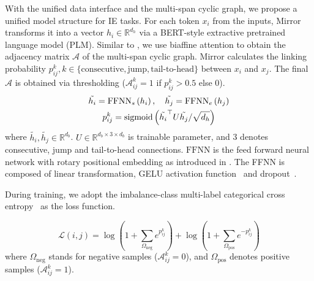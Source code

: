 With the unified data interface and the multi-span cyclic graph, we propose a unified model structure for IE tasks.
For each token $x_i$ from the inputs, Mirror transforms it into a vector $h_i \in \mathbb{R}^{d_h}$ via a BERT-style extractive pretrained language model (PLM).
Similar to \citet{ner-as-dp}, we use biaffine attention to obtain the adjacency matrix $\mathcal{A}$ of the multi-span cyclic graph.
Mirror calculates the linking probability $p_{ij}^{k}, k \in \{\text{consecutive}, \text{jump}, \text{tail-to-head}\}$ between $x_i$ and $x_j$.
The final $\mathcal{A}$ is obtained via thresholding ($\mathcal{A}_{ij}^{k}=1$ if $p_{ij}^{k} > 0.5$ else 0).
\begin{equation}
    \label{eqn:sim_calc}
    \begin{gathered}
    \tilde{h_i} = \text{FFNN}_{s}\left(h_i\right), \quad \tilde{h_j} = \text{FFNN}_{e}\left(h_j\right) \\
    p_{ij}^{k} = \text{sigmoid}\left(\tilde{h_i}^{\top} U \tilde{h_j} / \sqrt{d_h}\right)
    \end{gathered} \\
\end{equation}
where $\tilde{h_i},\tilde{h_j} \in \mathbb{R}^{d_b}$.
$U \in \mathbb{R}^{d_b \times 3 \times d_b}$ is trainable parameter, and 3 denotes consecutive, jump and tail-to-head connections.
$\text{FFNN}$ is the feed forward neural network with rotary positional embedding as introduced in \citet{roformer}.
The FFNN is composed of linear transformation, GELU activation function~\cite{gelu} and dropout~\cite{dropout}.

During training, we adopt the imbalance-class multi-label categorical cross entropy~\cite{global_pointer} as the loss function.

\begin{equation}
    \label{eqn:loss}
    \mathcal{L}(i,j) = \log \left(1 + \sum_{\Omega_{\text{neg}}} e^{p_{ij}^{k}}\right) + \log \left(1 + \sum_{\Omega_{\text{pos}}} e^{-p_{ij}^{k}}\right)
\end{equation}
where $\Omega_{\text{neg}}$ stands for negative samples ($\mathcal{A}_{ij}^{k}=0$), and $\Omega_{\text{pos}}$ denotes positive samples ($\mathcal{A}_{ij}^{k}=1$).
